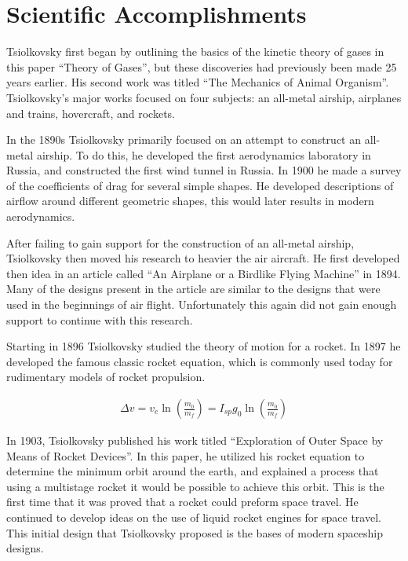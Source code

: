 \documentclass[10pt]{armath}
\begin{document}
\section{Scientific Accomplishments}%
\label{sec:scientific_accomplishments}

Tsiolkovsky first began by outlining the basics of the kinetic theory of gases
in this paper ``Theory of Gases'', but these discoveries had previously been made
25 years earlier. His second work was titled ``The Mechanics of Animal
Organism''. Tsiolkovsky's major works focused on four subjects: an all-metal
airship, airplanes and trains, hovercraft, and rockets.

In the 1890s Tsiolkovsky primarily focused on an attempt to construct an
all-metal airship. To do this, he developed the first aerodynamics laboratory
in Russia, and constructed the first wind tunnel in Russia. In 1900 he made a
survey of the coefficients of drag for several simple shapes. He developed
descriptions of airflow around different geometric shapes, this would later
results in modern aerodynamics.

After failing to gain support for the construction of an all-metal airship,
Tsiolkovsky then moved his research to heavier the air aircraft. He first
developed then idea in an article called ``An Airplane or a Birdlike Flying
Machine'' in 1894. Many of the designs present in the article are similar to the
designs that were used in the beginnings of air flight. Unfortunately this again
did not gain enough support to continue with this research.

Starting in 1896 Tsiolkovsky studied the theory of motion for a rocket. In 1897
he developed the famous classic rocket equation, which is commonly used today
for rudimentary models of rocket propulsion.

\begin{align*}
  \Delta v=v_e\ln\left(\frac{m_0}{m_f}\right)=I_{sp}g_0\ln\left(\frac{m_0}{m_f}\right)
\end{align*}

In 1903, Tsiolkovsky published his work titled ``Exploration of Outer Space by
Means of Rocket Devices''. In this paper, he utilized his rocket equation to
determine the minimum orbit around the earth, and explained a process that
using a multistage rocket it would be possible to achieve this orbit. This is
the first time that it was proved that a rocket could preform space travel. He
continued to develop ideas on the use of liquid rocket engines for space
travel. This initial design that Tsiolkovsky proposed is the bases of modern
spaceship designs.
\end{document}

